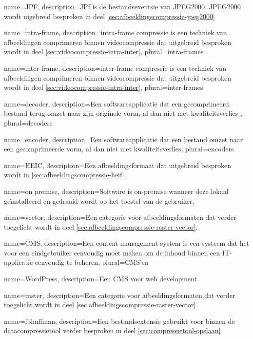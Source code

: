 {
	name={JPF},
	description={JPf is de bestandsexentsie van JPEG2000. JPEG2000 wordt uigebreid besproken in deel \ref{sec:afbeeldingscompressie-jpeg2000}}
}

{
	name={intra-frame},
	description={intra-frame compressie is een techniek van afbeeldingen comprimeren binnen videocompressie dat uitgebreid besproken wordt in deel \ref{sec:videocompressie-intra-inter}},
	plural={intra-frames}
}

{
	name={inter-frame},
	description={inter-frame compressie is een techniek van afbeeldingen comprimeren binnen videocompressie dat uitgebreid besproken wordt in deel \ref{sec:videocompressie-intra-inter}},
	plural={inter-frames}
}

{
	name={decoder},
	description={Een softwareapplicatie dat een gecomprimeerd bestand terug omzet naar zijn originele vorm, al dan niet met kwaliteitsverlies },
	plural={decoders}
}

{
	name={encoder},
	description={Een softwareapplicatie dat een bestand omzet naar een gecomprimeerde vorm, al dan niet met kwaliteitsverlies},
	plural={encoders}
}

{
	name={HEIC},
	description={Een afbeeldingsformaat dat uitgebreid besproken wordt in \ref{sec:afbeeldingscompressie-heif}},
}

{
	name={on premise},
	description={Software is on-premise wanneer deze lokaal geïnstalleerd en gedraaid wordt op het toestel van de gebruiker},
}

{
	name={vector},
	description={Een categorie voor afbeeldingsformaten dat verder toegelicht wordt in deel \ref{sec:afbeeldingscompressie-raster-vector}},
}

{
	name={CMS},
	description={Een content management system is een systeem dat het voor een eindgebruiker eenvoudig moet maken om de inhoud binnen een IT-applicatie eenvoudig te beheren},
	plural={CMS'en}
}

{
	name={WordPress},
	description={Een CMS voor web development}
}

{
	name={raster},
	description={Een categorie voor afbeeldingsformaten dat verder toegelicht wordt in deel \ref{sec:afbeeldingscompressie-raster-vector}}
}

{
	name={lbhuffman},
	description={Een bestandsextensie gebruikt voor binnen de datacompressietool verder besproken in deel \ref{sec:compressietool-opslaan}}
}


